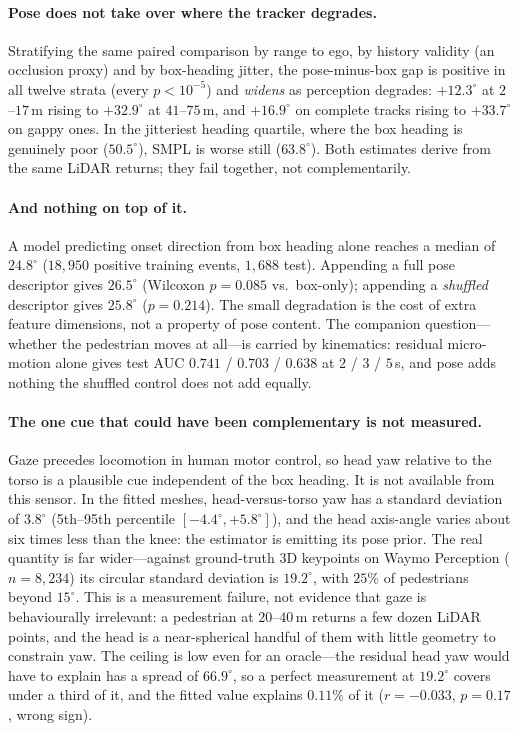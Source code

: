 \documentclass{article} %
\begin{document}
\paragraph{Pose does not take over where the tracker degrades.}
Stratifying the same paired comparison by range to ego, by history validity (an
occlusion proxy) and by box-heading jitter, the pose-minus-box gap is positive in
all twelve strata (every $p<10^{-5}$) and \emph{widens} as perception degrades:
$+12.3^\circ$ at $2$--$17$\,m rising to $+32.9^\circ$ at $41$--$75$\,m, and
$+16.9^\circ$ on complete tracks rising to $+33.7^\circ$ on gappy ones. In the
jitteriest heading quartile, where the box heading is genuinely poor
($50.5^\circ$), SMPL is worse still ($63.8^\circ$). Both estimates derive from the
same LiDAR returns; they fail together, not complementarily.

\paragraph{And nothing on top of it.}
A model predicting onset direction from box heading alone reaches a median of
$24.8^\circ$ ($18{,}950$ positive training events, $1{,}688$ test). Appending a
full pose descriptor gives $26.5^\circ$ (Wilcoxon $p{=}0.085$ vs.\ box-only);
appending a \emph{shuffled} descriptor gives $25.8^\circ$ ($p{=}0.214$). The small
degradation is the cost of extra feature dimensions, not a property of pose
content. The companion question---whether the pedestrian moves at all---is carried
by kinematics: residual micro-motion alone gives test AUC $0.741$ / $0.703$ /
$0.638$ at $2$ / $3$ / $5$\,s, and pose adds nothing the shuffled control does not
add equally.

\paragraph{The one cue that could have been complementary is not measured.}
Gaze precedes locomotion in human motor control, so head yaw relative to the torso
is a plausible cue independent of the box heading. It is not available from this
sensor. In the fitted meshes, head-versus-torso yaw has a standard deviation of
$3.8^\circ$ (5th--95th percentile $[-4.4^\circ, +5.8^\circ]$), and the head
axis-angle varies about six times less than the knee: the estimator is emitting
its pose prior. The real quantity is far wider---against ground-truth 3D keypoints
on Waymo Perception ($n{=}8{,}234$) its circular standard deviation is
$19.2^\circ$, with $25\%$ of pedestrians beyond $15^\circ$. This is a measurement
failure, not evidence that gaze is behaviourally irrelevant: a pedestrian at
$20$--$40$\,m returns a few dozen LiDAR points, and the head is a near-spherical
handful of them with little geometry to constrain yaw. The ceiling is low even for
an oracle---the residual head yaw would have to explain has a spread of
$66.9^\circ$, so a perfect measurement at $19.2^\circ$ covers under a third of it,
and the fitted value explains $0.11\%$ of it ($r{=}-0.033$, $p{=}0.17$, wrong
sign).
\end{document}
